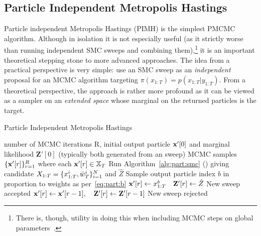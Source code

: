 \subsection{Particle Independent Metropolis Hastings}
\label{sec:part:pmcmc:pimh}

Particle independent Metropolis Hastings (PIMH) is the simplest PMCMC algorithm.  Although in isolation it is
not especially useful (as it strictly worse than running independent SMC sweeps and combining 
them),\footnote{There is, though, utility in doing this when including MCMC steps on global parameters~\cite{andrieu2010particle}.}
 it is an
important theoretical stepping stone to more advanced approaches.  The idea from a practical perspective 
is very simple: use an SMC sweep as an \emph{independent} proposal for an MCMC algorithm targeting $\pi(x_{1:T}) = p(x_{1:T}|y_{1:T})$.
From a theoretical perspective, the approach is rather more profound as it can be viewed as a sampler on 
an \emph{extended space} whose marginal on the returned particles is the target.  

\begin{algorithm}[tb]
	\caption{Particle Independent Metropolis Hastings}
	\label{alg:part:pimh}
	\begin{spacing}{1.2}
		\begin{algorithmic}[1]
			\renewcommand{\algorithmicrequire}{\textbf{Inputs:}}
			\renewcommand{\algorithmicensure}{\textbf{Outputs:}}				 
			\Require number of MCMC iterations R, initial output particle $\mathbf{x}'[0]$ and marginal likelihood
			$\mathbf{Z}'[0]$ (typically both generated from an \smc sweep)
			\Ensure MCMC samples $\{\mathbf{x}'[r]\}_{r=1}^R$ where each $\mathbf{x}'[r] \in \mathbb{X}_T$
			\State Run Algorithm~\ref{alg:part:smc} (\smc) giving candidate $X_{1:T} = \{x_{1:T}^{i},\bar w_T^{i}\}_{i=1}^N$
				 and $\hat{Z}$
			\State Sample output particle index $b$ in proportion to weights as per~\eqref{eq:part:b}
			\State $\mathbf{x}'[r] \leftarrow x_{1:T}^b \quad \mathbf{Z}'[r] \leftarrow \hat{Z}$  \Comment New sweep accepted
			\Else
			\State $\mathbf{x}'[r]\leftarrow \mathbf{x}'[r-1], \quad \mathbf{Z}'[r] \leftarrow \mathbf{Z}'[r-1]$ \Comment New sweep rejected
			\EndIf
			\EndFor
		\end{algorithmic}
	\end{spacing}
\end{algorithm}

